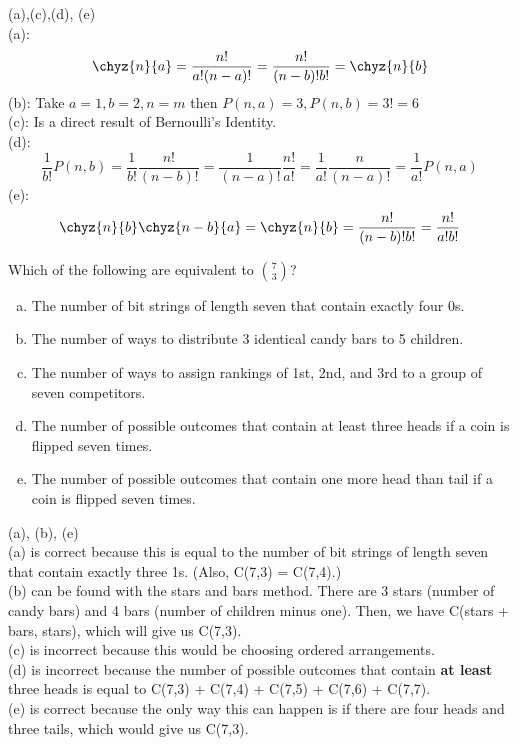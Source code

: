 \begin{solution}
\begin{solution}
(a),(c),(d), (e)\\
(a):$$ \chyz{n}{a} = \frac{n!}{a!(n-a)!} = \frac{n!}{(n-b)!b!}= \chyz{n}{b}$$
(b): Take $a=1,b=2,n=m$ then $P(n,a) = 3, P(n,b) = 3!=6$ \\
(c): Is a direct result of Bernoulli's Identity.\\
(d): $$\frac{1}{b!}P(n,b) = \frac{1}{b!}\frac{n!}{(n-b)!} = \frac{1}{(n-a)!}\frac{n!}{a!} = \frac{1}{a!}\frac{n}{(n-a)!} = \frac{1}{a!}P(n,a)$$
(e): $$\chyz{n}{b}\chyz{n-b}{a} = \chyz{n}{b} = \frac{n!}{(n-b)!b!} = \frac{n!}{a!b!}$$

\end{solution}


Which of the following are equivalent to $\binom{7}{3}$?
\begin{enumerate}[(a)]
	\item  The number of bit strings of length seven that contain exactly four 0s.
    
	\item  The number of ways to distribute 3 identical candy bars to 5 children.
    
	\item  The number of ways to assign rankings of 1st, 2nd, and 3rd to a group of seven competitors.
    
	\item  The number of possible outcomes that contain at least three heads if a coin is flipped seven times.
    
	\item  The number of possible outcomes that contain one more head than tail if a coin is flipped seven times.

\end{enumerate}
\begin{solution}

(a), (b), (e) \\
(a) is correct because this is equal to the number of bit strings of length seven that contain exactly three 1s. (Also, C(7,3) = C(7,4).) \\
(b) can be found with the stars and bars method. There are 3 stars (number of candy bars) and 4 bars (number of children minus one). Then, we have C(stars + bars, stars), which will give us C(7,3). \\
(c) is incorrect because this would be choosing ordered arrangements. \\
(d) is incorrect because the number of possible outcomes that contain \textbf{at least} three heads is equal to C(7,3) + C(7,4) + C(7,5) + C(7,6) + C(7,7). \\
(e) is correct because the only way this can happen is if there are four heads and three tails, which would give us C(7,3).


\end{solution}
\end{solution}
